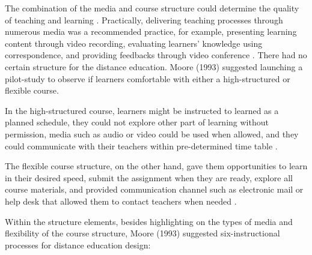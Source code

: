 The combination of the media and course structure could determine the quality of teaching and learning \cite{moore1993theory}. Practically, delivering teaching processes through numerous media was a recommended practice, for example, presenting learning content through video recording, evaluating learners' knowledge using correspondence, and providing feedbacks through video conference \cite{moore1993theory}. There had no certain structure for the distance education. Moore (1993) \cite{moore1993theory} suggested launching a pilot-study to observe if learners comfortable with either a high-structured or flexible course. 

In the high-structured course, learners might be instructed to learned as a planned schedule, they could not explore other part of learning without permission, media such as audio or video could be used when allowed, and they could communicate with their teachers within pre-determined time table \cite{moore2011distance}. 

The flexible course structure, on the other hand, gave them opportunities to learn in their desired speed, submit the assignment when they are ready, explore all course materials, and provided communication channel such as electronic mail or help desk that allowed them to contact teachers when needed \cite{moore2011distance}.

Within the structure elements, besides highlighting on the types of media and flexibility of the course structure, Moore (1993) \cite{moore1993theory} suggested six-instructional processes for distance education design: 


